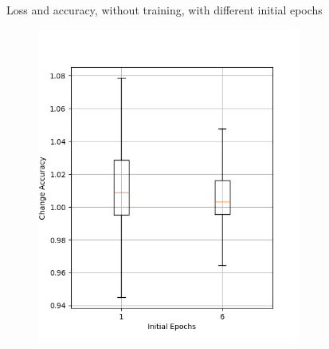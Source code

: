 \begin{figure}
\begin{subfigure}{0.5\textwidth}
    \end{subfigure}
    \caption{Loss and accuracy, without training, with different initial epochs}
    \label{fig:initial-epochs-notraining}
\end{figure}
\begin{figure}
    \begin{subfigure}{0.5\textwidth}
        \centering
        \includegraphics[width=0.95\textwidth]{plots/InitEpoch_Trained_accuracy.png}
    \end{subfigure}
    \begin{subfigure}{0.5\textwidth}
        \centering

\end{subfigure}
\end{figure}
